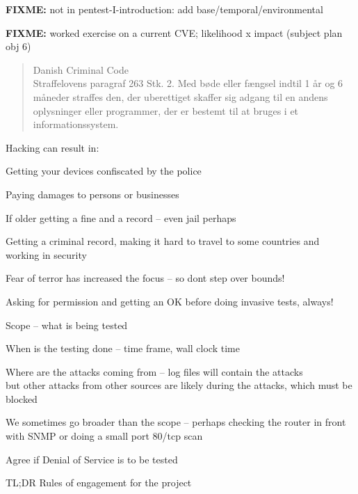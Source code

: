 \documentclass[Screen16to9,17pt]{foils}
\begin{document}
\begin{list2}
\item \textbf{FIXME:} not in pentest-I-introduction: add base/temporal/environmental
\item \textbf{FIXME:} worked exercise on a current CVE; likelihood x impact (subject plan obj 6)
\end{list2}


\begin{quote}\small
Danish Criminal Code\\
Straffelovens paragraf 263 Stk. 2. Med bøde eller fængsel indtil 1 år og 6 måneder straffes den, der uberettiget skaffer sig adgang til en andens oplysninger eller programmer, der er bestemt til at bruges i et informationssystem.
\end{quote}

Hacking can result in:
\begin{list2}
\item Getting your devices confiscated by the police
\item Paying damages to persons or businesses
\item If older getting a fine and a record -- even jail perhaps
\item Getting a criminal record, making it hard to travel to some countries and working in security
\item Fear of terror has increased the focus -- so dont step over bounds!
\end{list2}

Asking for permission and getting an OK before doing invasive tests, always!



\begin{list2}
\item Scope -- what is being tested
\item When is the testing done -- time frame, wall clock time
\item Where are the attacks coming from -- log files will contain the attacks\\
but other attacks from other sources are likely during the attacks, which must be blocked
\item We sometimes go broader than the scope -- perhaps checking the router in front with SNMP or doing a small port 80/tcp scan
\item Agree if Denial of Service is to be tested
\item TL;DR Rules of engagement for the project
\end{list2}
\end{document}
